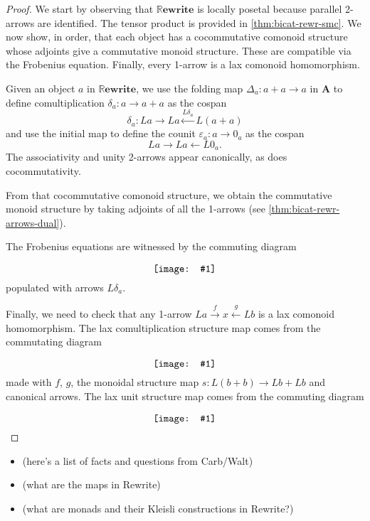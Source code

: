 \documentclass[]{amsart}
\renewcommand{\epsilon}{\varepsilon}
\newcommand{\A}{\cat{A}}
\newcommand{\cat}[1]{\mathbf{#1}}
\newcommand{\from}{\colon}
\newcommand{\xto}[1]{\xrightarrow{#1}}
\newcommand{\xgets}[1]{\xleftarrow{#1}}
\newcommand{\diagram}[1]{\raisebox{-0.5\height}{\texttt{[image: \#1]}}}
\newcommand{\RRewrite}{ \mathbb{R}\mathbf{ewrite} }
\newcommand{\edit}[1]{\textcolor{editcolour}{(#1)}}
\theoremstyle{remark}
\theoremstyle{definition}
\begin{document}
\begin{proof}

  We start by observing that $ \RRewrite $ is locally posetal because
  parallel 2-arrows are identified. The tensor product is provided in
  \ref{thm:bicat-rewr-smc}. We now show, in order, that each object
  has a cocommutative comonoid structure whose adjoints give a
  commutative monoid structure.  These are compatible via the
  Frobenius equation. Finally, every 1-arrow is a lax comonoid
  homomorphism.
	
  Given an object $ a $ in $ \RRewrite $, we use the folding map
  $ \Delta_{a} \from a + a \to a $ in $ \A $ to define
  comultiplication $ \delta_a \from a \to a + a $ as the cospan
  \[
    \delta_a \from La \to La \xgets{L\delta_a} L(a + a)
  \]
  and use the initial map to define the counit
  $ \epsilon_a \from a \to 0_a $ as the cospan
  \[
    La \to La \gets L0_a.
  \]
  The associativity and unity 2-arrows appear canonically, as does
  cocommutativity.
	
  From that cocommutative comonoid structure, we obtain the
  commutative monoid structure by taking adjoints of all the 1-arrows
  (see \ref{thm:bicat-rewr-arrows-dual}).
	
  The Frobenius equations are witnessed by the commuting diagram
  \[
    \diagram{diag_nlr_bi-rewrite-frobenius}
  \]
  populated with arrows $ L \delta_a $.
	
  Finally, we need to check that any 1-arrow
  $ La \xto{f} x \xgets{g} Lb $ is a lax comonoid homomorphism. The
  lax comultiplication structure map comes from the commutating
  diagram
  \[
    \diagram{diag_nlr_bi-rewrite-lax-comul}
  \]
  made with $ f $, $ g $, the monoidal structure map
  $ s \from L(b+b) \to Lb+Lb $ and canonical arrows. The lax unit
  structure map comes from the commuting diagram
  \[
    \diagram{diag_nlr_bi-rewrite-lax-counit} \qedhere
  \]
  
\end{proof}

\begin{itemize}
	\item \edit{here's a list of facts and questions from Carb/Walt}
	\item \edit{what are the maps in Rewrite}
	\item \edit{what are monads and their Kleisli constructions in Rewrite?}
\end{itemize}

\end{document}
